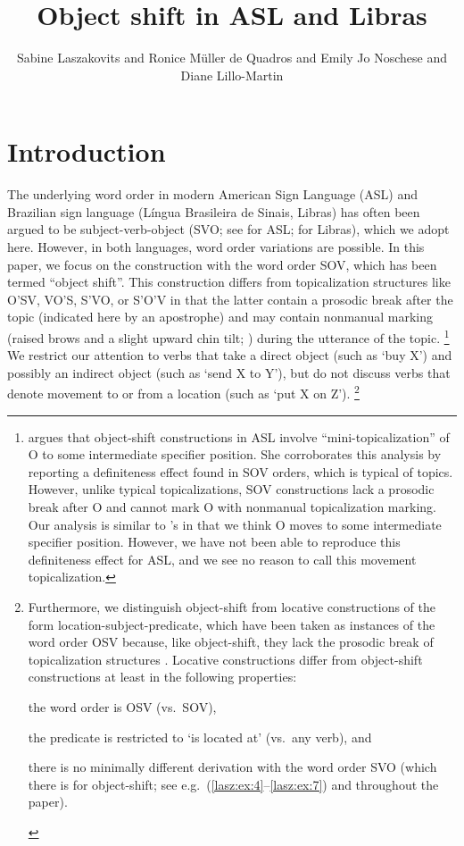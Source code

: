 \documentclass[output=paper]{langscibook}
\author{Sabine Laszakovits\affiliation{Austrian Academy of Sciences; University of Connecticut} and {Ronice Müller de} Quadros\affiliation{Universidade Federal de Santa Catarina} and {Emily Jo} Noschese\affiliation{University of Hawai'i} and Diane Lillo-Martin\affiliation{University of Connecticut; Haskins Laboratories}}
\title{Object shift in ASL and Libras}
\begin{document}
\maketitle

\section{Introduction}
\label{lasz:sec:1}

The underlying word order in modern American Sign Language (ASL)
and Brazilian sign language (Língua Brasileira de Sinais, Libras) has
often been argued to be subject-verb-object (SVO; 
see \citealp{Fischer.1975,Liddell.1980,Padden.1988} for ASL; 
\citealp{Quadros.1999,Quadros.2003} for Libras), 
which we adopt here. However, in both languages, word order
variations are possible. In this paper, we focus on the construction with
the word order SOV, which has been termed ``object shift''. This
construction differs from topicalization structures like O'SV, VO'S,
S'VO, or S'O'V in that the latter contain a prosodic break after the
topic (indicated here by an apostrophe) and may contain nonmanual
marking (raised brows and a slight upward chin tilt; 
\citealp{Liddell.1977,Liddell.1980,Padden.1988}) during the utterance of the topic.%
\footnote{\citet{Fischer.1990} argues that object-shift constructions in ASL involve
    ``mini-topicalization'' of O to some intermediate specifier position. She corroborates
    this analysis by reporting a definiteness effect found in SOV orders, which is typical
    of topics. However, unlike typical topicalizations, SOV constructions lack a prosodic
    break after O and cannot mark O with nonmanual topicalization marking. Our
    analysis is similar to \citeauthor{Fischer.1990}'s in that we think O moves to some intermediate
    specifier position. However, we have not been able to reproduce this definiteness
    effect for ASL, and we see no reason to call this movement topicalization.
}
We restrict our attention to verbs that take a direct object (such as `buy X') and
possibly an indirect object (such as `send X to Y'), but do not discuss
verbs that denote movement to or from a location (such as `put X on Z').%
\footnote{Furthermore, we distinguish object-shift from locative constructions of the
    form location-subject-predicate, which have been taken as instances of the word
    order OSV because, like object-shift, they lack the prosodic break of topicalization
    structures \citep{Liddell.1980}. Locative constructions differ from object-shift
    constructions at least in the following properties: 
    \begin{inparaenum}[(i)]
        \item the word order is OSV (vs.~SOV),
        \item the predicate is restricted to `is located at' (vs.~any verb), and 
        \item there is no minimally different derivation with the word order SVO (which there is for
    object-shift; see e.g.~(\ref{lasz:ex:4}--\ref{lasz:ex:7}) and throughout the paper).
    \end{inparaenum}
}
\end{document}
